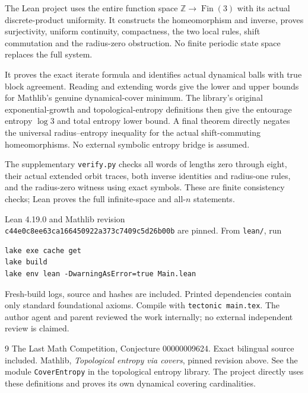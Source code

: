\documentclass[11pt]{article}
\begin{document}
The Lean project uses the entire function space
$\mathbb Z\to\operatorname{Fin}(3)$ with its actual
discrete-product uniformity. It constructs the
homeomorphism and inverse, proves surjectivity,
uniform continuity, compactness, the two local rules,
shift commutation and the radius-zero obstruction.
No finite periodic state space replaces the full system.

It proves the exact iterate formula and identifies
actual dynamical balls with true block agreement.
Reading and extending words give the lower and upper
bounds for Mathlib's genuine dynamical-cover minimum.
The library's original exponential-growth and
topological-entropy definitions then give the
entourage entropy $\log3$ and total entropy lower
bound. A final theorem directly negates the
universal radius--entropy inequality for the actual
shift-commuting homeomorphisms. No external symbolic
entropy bridge is assumed.

The supplementary \texttt{verify.py} checks all words
of lengths zero through eight, their actual extended
orbit traces, both inverse identities and radius-one
rules, and the radius-zero witness using exact symbols.
These are finite consistency checks; Lean proves
the full infinite-space and all-$n$ statements.

Lean 4.19.0 and Mathlib revision\\
\texttt{c44e0c8ee63ca166450922a373c7409c5d26b00b}
are pinned. From \texttt{lean/}, run
\begin{verbatim}
lake exe cache get
lake build
lake env lean -DwarningAsError=true Main.lean
\end{verbatim}
Fresh-build logs, source and hashes are included.
Printed dependencies contain only standard foundational
axioms. Compile with \texttt{tectonic main.tex}.
The author agent and parent reviewed the work internally;
no external independent review is claimed.

\begin{thebibliography}{9}
 The Last Math Competition,
Conjecture 00000009624. Exact bilingual source included.
 Mathlib, \emph{Topological entropy via
covers}, pinned revision above. See the module
\texttt{CoverEntropy} in the topological entropy library.
The project directly uses these definitions and proves
its own dynamical covering cardinalities.
\end{thebibliography}
\end{document}
